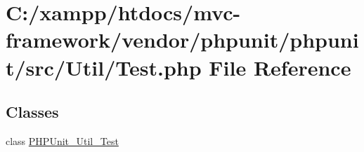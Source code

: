 \hypertarget{vendor_2phpunit_2phpunit_2src_2_util_2test_8php}{}\section{C\+:/xampp/htdocs/mvc-\/framework/vendor/phpunit/phpunit/src/\+Util/\+Test.php File Reference}
\label{vendor_2phpunit_2phpunit_2src_2_util_2test_8php}
\subsection*{Classes}
\begin{DoxyCompactItemize}
\item 
class \hyperlink{class_p_h_p_unit___util___test}{P\+H\+P\+Unit\+\_\+\+Util\+\_\+\+Test}
\end{DoxyCompactItemize}
